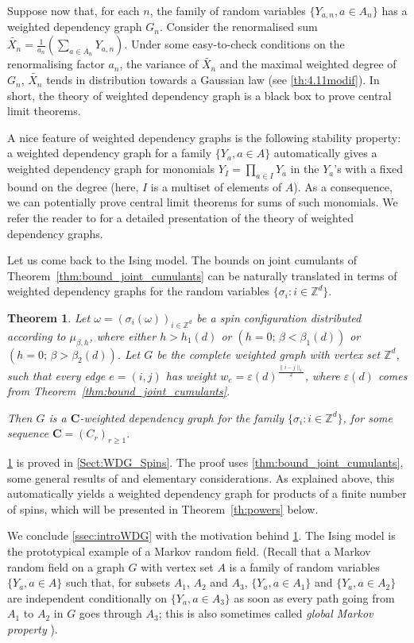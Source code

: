 \documentclass{amsart}
\newcommand{\field}[1]{\mathbb{#1}}
\newcommand{\Z}{\field{Z}}
\def\WDep{G}
\def\eps{\varepsilon}
\newcommand{\dist}[2]{\|#1 - #2\|_1}
\numberwithin{equation}{section}
\newtheorem{theorem}{Theorem}[section]
\theoremstyle{remark}
\begin{document}
Suppose now that, for each $n$, the 
family of random variables $\{Y_{a,n}, a \in A_n\}$ has a weighted dependency graph $G_n$.
Consider the renormalised sum $\widetilde{X_n}=\tfrac{1}{a_n}\left(\sum_{a \in A_n} Y_{a,n} \right)$.
Under some easy-to-check conditions on the renormalising factor $a_n$,
the variance of $\widetilde{X_n}$ and the maximal weighted degree of $G_n$,
$\widetilde{X_n}$ tends in distribution towards a Gaussian law (see \cref{th:4.11modif}).
In short, the theory of weighted dependency graph is a black box to prove central limit theorems.

A nice feature of weighted dependency graphs is the following stability property:
a weighted dependency graph for a family $\{Y_a, a \in A\}$
automatically gives a weighted dependency graph for monomials $Y_I=\prod_{a \in I} Y_a$
in the $Y_a$'s with a fixed bound on the degree (here, $I$ is a multiset of elements of $A$).
As a consequence, we can potentially prove central limit theorems for sums of such monomials.
We refer the reader to \cite{Valentin} for a detailed presentation of the theory
of weighted dependency graphs.
\medskip

Let us come back to the Ising model.
The bounds on joint cumulants of Theorem~\ref{thm:bound_joint_cumulants}
can be naturally translated in terms of weighted dependency graphs for the random variables $\{\sigma_i : i \in \Z^d \}$.
\begin{theorem}
\label{th:depgraph}
Let $\omega = (\sigma_i (\omega))_{i \in \Z^d}$ be a spin configuration
distributed according to $\mu_{\beta,h}$,
where either $h > h_1(d)$ or $(h=0;\, \beta < \beta_1(d))$ or $(h=0;\, \beta > \beta_2(d))$.
Let $\WDep$ be the complete weighted graph with vertex set $\Z^d$, such that every edge $e = (i,j)$ has weight $w_e = \eps(d)^{\frac{\dist{i}{j}}{2}}$, where $\eps(d)$ comes from Theorem~\ref{thm:bound_joint_cumulants}.

Then $\WDep$ is a $\mathbf{C}$-weighted dependency graph for the family $\{\sigma_i : i \in \Z^d \}$,
for some sequence  $\mathbf{C} = (C_r)_{r \geq 1}.$
\end{theorem}
\cref{th:depgraph} is proved in \cref{Sect:WDG_Spins}.
The proof uses \cref{thm:bound_joint_cumulants}, some general results of \cite{Valentin}
and elementary considerations.
As explained above,
this automatically yields a weighted dependency graph
for products of a finite number of spins,
which will be presented in Theorem~\ref{th:powers} below.
\bigskip


We conclude \cref{ssec:introWDG} with the motivation behind \cref{th:depgraph}.
The Ising model is the prototypical example of a Markov random field.
(Recall that a Markov random field on a graph $G$ with vertex set $A$ 
is a family of random variables
$\{Y_a, a \in A\}$ such that, for subsets $A_1$, $A_2$ and $A_3$,
$\{Y_a, a \in A_1\}$ and $\{Y_a, a \in A_2\}$ are independent conditionally on $\{Y_a, a \in A_3\}$
as soon as every path going from $A_1$ to $A_2$ in $G$ goes through $A_3$;
this is also sometimes called {\em global Markov property} \cite{MarkovRandomFields}).
\end{document}
